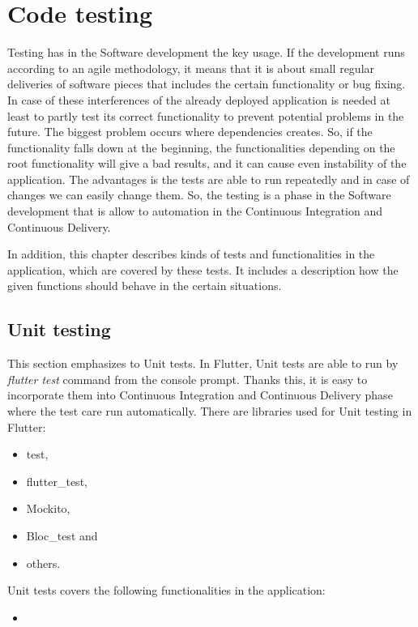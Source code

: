 \section{Code testing}\label{sec:code-testing}
Testing has in the Software development the key usage.
If the development runs according to an agile methodology, it means that it is about small regular deliveries of software pieces that includes the certain functionality or bug fixing.
In case of these interferences of the already deployed application is needed at least to partly test its correct functionality to prevent potential problems in the future.
The biggest problem occurs where dependencies creates.
So, if the functionality falls down at the beginning, the functionalities depending on the root functionality will give a bad results, and it can cause even instability of the application.
The advantages is the tests are able to run repeatedly and in case of changes we can easily change them.
So, the testing is a phase in the Software development that is allow to automation in the Continuous Integration and Continuous Delivery.

In addition, this chapter describes kinds of tests and functionalities in the application, which are covered by these tests.
It includes a description how the given functions should behave in the certain situations.


\subsection{Unit testing}\label{subsec:unit-testing}
This section emphasizes to Unit tests.
In Flutter, Unit tests are able to run by \textit{flutter test} command from the console prompt.
Thanks this, it is easy to incorporate them into Continuous Integration and Continuous Delivery phase where the test care run automatically.
There are libraries used for Unit testing in Flutter:
\begin{itemize}
    \item test,
    \item flutter\_test,
    \item Mockito,
    \item Bloc\_test and
    \item others.
\end{itemize}

Unit tests covers the following functionalities in the application:
\begin{itemize}
    \item %
\end{itemize}


